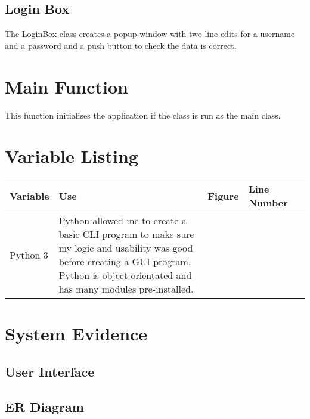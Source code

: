 \subsection{Login Box}


The LoginBox class creates a popup-window with two line edits for a username and a password and a push button to check the data is correct.


\section{Main Function}


This function initialises the application if the class is run as the main class.




\section{Variable Listing}
\begin{center}
	\begin{tabular}{|p{2cm}|p{2cm}|p{2cm}|p{2cm}|l}
		\hline
		\textbf{Variable}  &  \textbf{Use}  &  \textbf{Figure}  &  \textbf{Line Number} \\ \hline
		Python 3 & Python allowed me to create a basic CLI program to make sure my logic and usability was good before creating a GUI program. Python is object orientated and has many modules pre-installed.\\ \hline
	\end{tabular}
\end{center}




\section{System Evidence}

\subsection{User Interface}

\subsection{ER Diagram}

